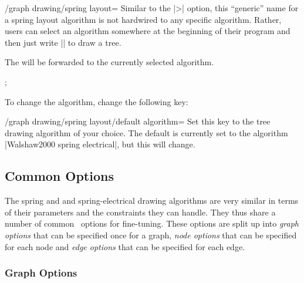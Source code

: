 \begin{key}{/graph drawing/spring layout=}
  Similar to the |>| option, this ``generic'' name for a spring layout
  algorithm is not hardwired to any specific algorithm. Rather, users
  can select an algorithm somewhere at the beginning of their program
  and then just write || to draw a tree.

  The  will be forwarded to the currently selected
  algorithm.
\begin{codeexample}[]
\tikz {};    
\end{codeexample}
  
  To change the algorithm, change the following key:
  \begin{key}{/graph drawing/spring layout/default algorithm=}
    Set this key to the tree drawing algorithm of your choice. The
    default is currently set to the algorithm
    |Walshaw2000 spring electrical|, but this will change. 
  \end{key}
\end{key}


\subsection{Common Options}

The spring and and spring-electrical drawing algorithms are very similar
in terms of their parameters and the constraints they can handle. They
thus share a number of common \tikzname\ options for fine-tuning. These
options are split up into \emph{graph options} that can be specified
once for a graph, \emph{node options} that can be specified for each
node and \emph{edge options} that can be specified for each edge.

\subsubsection{Graph Options}

%
%

